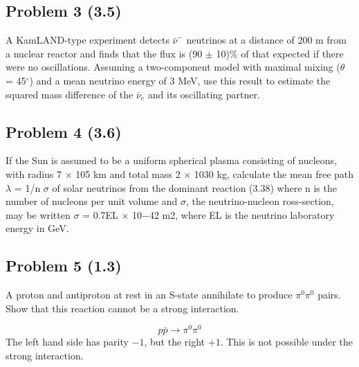 \documentclass{article}
\begin{document}
\clearpage
\subsection*{Problem 3 (3.5)}
\begin{mdframed}
A KamLAND-type experiment detects $\bar{ν}^{-}$ neutrinos at a distance of 200 m from a nuclear reactor and finds that the flux is (90 $±$ 10)\% of that expected if there were no oscillations. Assuming a two-component model with maximal mixing ($θ$ = 45$^∘$) and a mean neutrino energy of 3 MeV, use this result to estimate the squared mass difference of the $\bar{ν}_e$ and its oscillating partner.
\end{mdframed}

\subsection*{Problem 4 (3.6)}
\begin{mdframed}
If the Sun is assumed to be a uniform spherical plasma consisting of nucleons,  with radius 7 × 105 km and total mass 2 × 1030 kg, calculate the mean free path $λ$ = 1/n $σ$ of solar neutrinos from the dominant reaction (3.38) where n is the number of nucleons per unit volume and $σ$, the neutrino-nucleon ross-section, may be written $σ$ = 0.7EL × 10−42 m2, where EL is the neutrino laboratory energy in GeV.
\end{mdframed}

\subsection*{Problem 5 (1.3)}
\begin{mdframed}
A proton and antiproton at rest in an S-state annihilate to produce $π^{0} π^{0}$ pairs. Show that this reaction cannot be a strong interaction.
\end{mdframed}
\begin{equation}
  p \bar{p} → π^{0} π^{0}
\end{equation}
The left hand side has parity $-1$, but the right $+1$. This is not possible under the strong interaction. 
\end{document}
